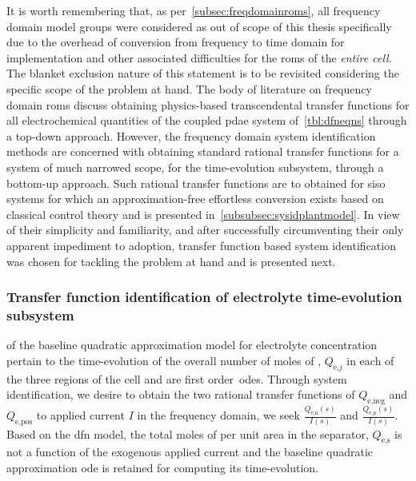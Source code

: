 It is worth remembering that, as per~\cref{subsec:freqdomainroms}, all frequency
domain model groups were considered as  out of scope of this thesis specifically
due  to  the   overhead  of  conversion  from  frequency  to   time  domain  for
implementation  and other  associated difficulties  for the  \glspl{rom} of  the
\emph{entire cell}.  The blanket  exclusion nature  of this  statement is  to be
revisited considering  the specific scope  of the problem  at hand. The  body of
literature  on  frequency  domain \glspl{rom}  discuss  obtaining  physics-based
transcendental  transfer functions  for  all electrochemical  quantities of  the
coupled  \gls{pdae} system  of~\cref{tbl:dfneqns} through  a top-down  approach.
However, the frequency  domain system identification methods  are concerned with
obtaining standard  rational transfer  functions for a  system of  much narrowed
scope, \ie{}  for the  time-evolution subsystem,  through a  bottom-up approach.
Such  rational transfer  functions are  to obtained  for \gls{siso}  systems for
which  an approximation-free  effortless  conversion exists  based on  classical
control  theory and  is presented  in~\cref{subsubsec:sysidplantmodel}. In  view
of  their  simplicity  and  familiarity, and  after  successfully  circumventing
their  only apparent  impediment  to adoption,  transfer  function based  system
identification was  chosen for  tackling the  problem at  hand and  is presented
next.


\subsubsection*{Transfer function identification of electrolyte time-evolution subsystem}\label{subsubsec:sysidplantmodel} %

 of the baseline
quadratic  approximation  model for  electrolyte  concentration  pertain to  the
time-evolution of the overall number  of moles of , $Q_{\text{e,}j}$ in
each  of  the  three  regions  of the  cell  and  are  first  order~\glspl{ode}.
Through system  identification, we  desire to obtain  the two  rational transfer
functions  of  $Q_\text{e,neg}$  and  $Q_\text{e,pos}$ to  applied  current  $I$
in  the  frequency  domain,  \ie{} we  seek  $\frac{Q_\text{e,n}(s)}{I(s)}$  and
$\frac{Q_\text{e,p}(s)}{I(s)}$. Based on the \gls{dfn} model, the total moles of
 per  unit area in the  separator, $Q_\text{e,s}$ is not  a function of
the exogenous applied current and the baseline quadratic approximation \gls{ode}
is retained for computing its time-evolution.

